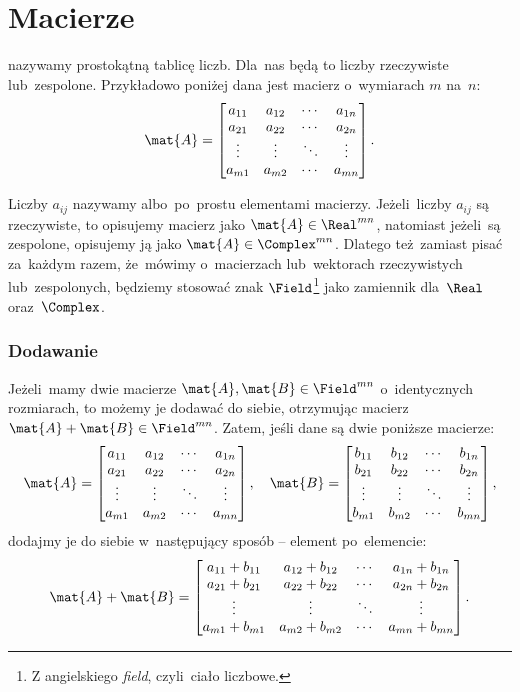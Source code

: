 \section{Macierze}
 nazywamy prostokątną tablicę liczb. Dla~nas
będą to liczby rzeczywiste lub~zespolone.
Przykładowo poniżej dana jest macierz o~wymiarach $m$ na~$n$:
$$
	\mat{A} =
	\begin{bmatrix}
		a_{11} & a_{12} & \cdots & a_{1n} \\
		a_{21} & a_{22} & \cdots & a_{2n} \\
		\vdots & \vdots & \ddots & \vdots \\
		a_{m1} & a_{m2} & \cdots & a_{mn}
	\end{bmatrix}.
$$

Liczby $a_{ij}$ nazywamy  albo~po~prostu
elementami macierzy.
Jeżeli~liczby $a_{ij}$ są rzeczywiste, to opisujemy macierz jako $\mat{A}\in
	\Real^{mn}$, natomiast jeżeli~są zespolone, opisujemy ją jako $\mat{A}\in\Complex^{mn}$. Dlatego
też~zamiast pisać za~każdym razem, że~mówimy o~macierzach lub~wektorach
rzeczywistych lub~zespolonych, będziemy stosować znak $\Field$\footnote{Z angielskiego \emph{field},
	czyli~ciało liczbowe.} jako zamiennik dla~$\Real$ oraz~$\Complex$.


\subsubsection{Dodawanie}
Jeżeli~mamy dwie macierze $\mat{A}, \mat{B}\in \Field^{mn}$ o~identycznych
rozmiarach, to możemy je dodawać do siebie, otrzymując macierz $\mat{A} +
	\mat{B}\in \Field^{mn}$. Zatem, jeśli dane są dwie poniższe macierze:
$$
	\mat{A} =
	\begin{bmatrix}
		a_{11} & a_{12} & \cdots & a_{1n} \\
		a_{21} & a_{22} & \cdots & a_{2n} \\
		\vdots & \vdots & \ddots & \vdots \\
		a_{m1} & a_{m2} & \cdots & a_{mn}
	\end{bmatrix}, \quad
	\mat{B} =
	\begin{bmatrix}
		b_{11} & b_{12} & \cdots & b_{1n} \\
		b_{21} & b_{22} & \cdots & b_{2n} \\
		\vdots & \vdots & \ddots & \vdots \\
		b_{m1} & b_{m2} & \cdots & b_{mn}
	\end{bmatrix},
$$
dodajmy je do siebie w~następujący sposób -- element po~elemencie:
$$
	\mat{A} + \mat{B} =
	\begin{bmatrix}
		a_{11} + b_{11} & a_{12} + b_{12} & \cdots & a_{1n} + b_{1n} \\
		a_{21} + b_{21} & a_{22} + b_{22} & \cdots & a_{2n} + b_{2n} \\
		\vdots          & \vdots          & \ddots & \vdots          \\
		a_{m1} + b_{m1} & a_{m2} + b_{m2} & \cdots & a_{mn} + b_{mn} \\
	\end{bmatrix}.
$$

